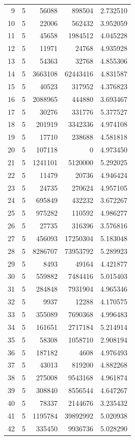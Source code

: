\begin{longtable}{rrrrr}
9 & 5 & 56088 & 898504 & 2.732510\\
10 & 5 & 22006 & 562432 & 3.952059\\
11 & 5 & 45658 & 1984512 & 4.045228\\
12 & 5 & 11971 & 24768 & 4.935928\\
13 & 5 & 54363 & 32768 & 4.855306\\
14 & 5 & 3663108 & 62443416 & 4.831587\\
15 & 5 & 40523 & 317952 & 4.376823\\
16 & 5 & 2088965 & 444880 & 3.693467\\
17 & 5 & 30276 & 331776 & 5.377527\\
18 & 5 & 201919 & 3342336 & 4.974108\\
19 & 5 & 17710 & 238688 & 4.581818\\
20 & 5 & 107118 & 0 & 4.973450\\
21 & 5 & 1241101 & 5120000 & 5.292025\\
22 & 5 & 11479 & 20736 & 4.946424\\
23 & 5 & 24735 & 270624 & 4.957105\\
24 & 5 & 695849 & 432232 & 3.672267\\
25 & 5 & 975282 & 110592 & 4.986277\\
26 & 5 & 27735 & 316396 & 3.576816\\
27 & 5 & 456093 & 17250304 & 5.183048\\
28 & 5 & 8286707 & 73953792 & 5.289923\\
29 & 5 & 8493 & 49164 & 4.421877\\
30 & 5 & 559882 & 7484416 & 5.015403\\
31 & 5 & 284848 & 7931904 & 4.965346\\
32 & 5 & 9937 & 12288 & 4.170575\\
33 & 5 & 355089 & 7690368 & 4.996483\\
34 & 5 & 161651 & 2717184 & 5.214914\\
35 & 5 & 58308 & 1058710 & 2.908194\\
36 & 5 & 187182 & 4608 & 4.976493\\
37 & 5 & 43013 & 819200 & 4.882268\\
38 & 5 & 275008 & 9543168 & 4.961874\\
39 & 5 & 308840 & 8556544 & 4.647267\\
40 & 5 & 78337 & 2144676 & 3.235432\\
41 & 5 & 1195784 & 39892992 & 5.020938\\
42 & 5 & 335450 & 9936736 & 5.028290\\

\end{longtable}
